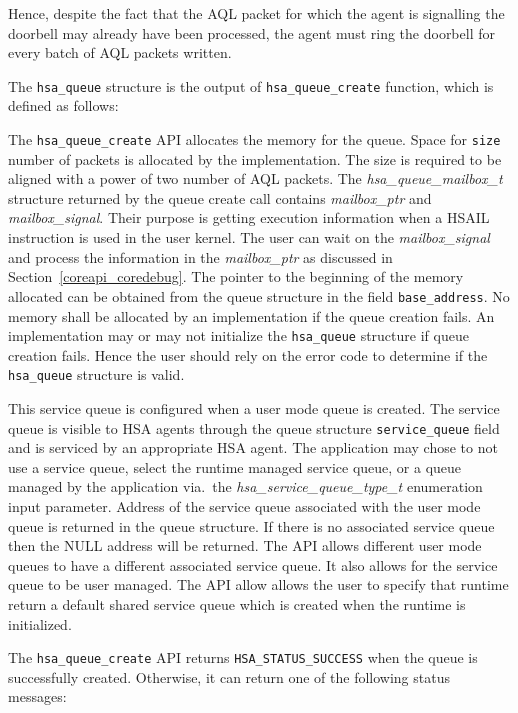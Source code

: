 Hence, despite the fact that the AQL packet for which the agent is
signalling the doorbell may already have been processed, the agent
must ring the doorbell for every batch of AQL packets written.

The \texttt{hsa\_queue} structure is the output of
\texttt{hsa\_queue\_create} function, which is defined as
follows:



The \texttt{hsa\_queue\_create} API allocates the memory for the
queue. Space for \texttt{size} number of packets is allocated by the
implementation. The size is required to be aligned with a power of
two number of AQL packets.
The {\itshape hsa\_queue\_mailbox\_t} structure returned by the
queue create call contains {\itshape mailbox\_ptr} and {\itshape
mailbox\_signal}. Their purpose is getting execution information
when a 
HSAIL instruction is used in the user kernel. The user can wait on
the {\itshape mailbox\_signal} and process the information in the
{\itshape mailbox\_ptr} as discussed in
Section~\ref{coreapi_coredebug}.
The pointer to the beginning of the memory allocated can be obtained
from the queue structure in the field \texttt{base\_address}.  No
memory shall be allocated by an implementation if the queue creation
fails. An implementation may or may not initialize the
\texttt{hsa\_queue} structure if queue creation fails. Hence the
user should rely on the error code to determine if the
\texttt{hsa\_queue} structure is valid.

This service queue is configured when a user mode queue is created.
The service queue is visible to HSA agents through the queue
structure \texttt{service\_queue} field and is serviced by an
appropriate HSA agent. The application may chose to not use a
service queue, select the runtime managed service queue, or a queue
managed by the application via.\ the {\itshape
hsa\_service\_queue\_type\_t} enumeration input parameter.  Address
of the service queue associated with the user mode queue is returned
in the queue structure. If there is no associated service queue then
the NULL address will be returned.  The API allows different user
mode queues to have a different associated service queue. It also
allows for the service queue to be user managed. The API allow
allows the user to specify that runtime return a default shared
service queue which is created when the runtime is initialized.

The \texttt{hsa\_queue\_create} API returns
\texttt{HSA\_STATUS\_SUCCESS} when the queue is successfully
created.  Otherwise, it can return one of the following status
messages:

